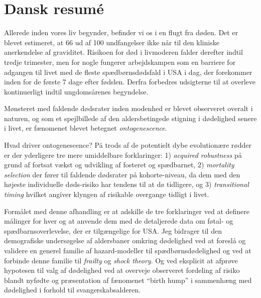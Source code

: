\documentclass[
  10pt, twoside
]{book}
\begin{document}
\clearpage


\section*{Dansk resumé}

Allerede inden vores liv begynder, befinder vi os i en flugt fra døden. Det er blevet estimeret, at 66 ud af 100 undfangelser ikke når til den kliniske anerkendelse af graviditet. Risikoen for død i livmoderen falder derefter indtil tredje trimester, men for nogle fungerer arbejdskampen som en barriere for adgangen til livet med de fleste spædbørnsdødsfald i USA i dag, der forekommer inden for de første 7 dage efter fødslen. Derfra forbedres udsigterne til at overleve kontinuerligt indtil ungdomsårenes begyndelse.

Mønsteret med faldende dødsrater inden modenhed er blevet observeret overalt i naturen, og som et spejlbillede af den aldersbetingede stigning i dødelighed senere i livet, er fænomenet blevet betegnet \emph{ontogenescence}.

Hvad driver ontogenescence? På trods af de potentielt dybe evolutionære rødder er der yderligere tre mere umiddelbare forklaringer: 1) \emph{acquired robustness} på grund af fortsat vækst og udvikling af fosteret og spædbarnet, 2) \emph{mortality selection} der fører til faldende dødsrater på kohorte-niveau, da dem med den højeste individuelle døds-risiko har tendens til at dø tidligere, og 3) \emph{transitional timing} hvilket angiver klyngen af risikable overgange tidligt i livet.

Formålet med denne afhandling er at adskille de tre forklaringer ved at definere målinger for hver og at anvende dem med de detaljerede data om føtal- og spædbarnsoverlevelse, der er tilgængelige for USA. Jeg bidrager til den demografiske undersøgelse af aldersbaner omkring dødelighed ved at foreslå og validere en generel familie af hazard-modeller til spædbørnsdødelighed og ved at forbinde denne familie til \emph{frailty} og \emph{shock theory}. Og ved eksplicit at afprøve hypotesen til valg af dødelighed ved at overveje observeret fordeling af risiko blandt nyfødte og præsentation af fænomenet ``birth hump'' i sammenhæng med dødelighed i forhold til svangerskabsalderen.
\end{document}
